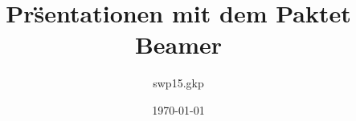 \documentclass{beamer}
\title[SWT-Praktikum]{Pr\"sentationen mit dem Paktet  Beamer}
\author{swp15.gkp}
\date{\today{}}
\begin{document}
\begin{comment}
\section{Allgemeines}
Im Rahmen des SWT-Praktikums wird ein kartenbasiertes Multiplayerspiel entwickelt, das es ermöglicht, ein an das alte Pacman angelehnte Computerspiel auf einem realen Kartenausschnitt zu spielen. Die entstehenden Highscores werden dann zu den jeweiligen Karten gespeichert, um sich mit anderen Spielern messen zu können.


\section{Produktübersicht}
Der Nutzer kann online über die Spiele Website auf das Programm zugreifen.
Der Spieler kann durch Scrollen über die Karte einen Spieleort auswählen. Es sind nur bestimmte Orte als Spielort zugelassen, um eine Vergleichbarkeit zu gewährleisten.
Hat man den Ort ausgewählt, wird das Spielfeld erzeugt und man kann ein neues Spiel beginnen. 
Man kann den Pucman nun mit Hilfe der Pfeiltasten steuern.
Ziel des Spiels ist es den Pucman über die Karte zu steuern und die Kekse, die auf der Karte verteilt liegen, zu fressen. 

An dieser Aufgabe will den Spieler der Geist hindern, der sich auch über das Spielfeld bewegt und Pucman fressen kann. Frisst ein Geist den Spieler, so wird %
die Anzahl seiner Leben wird um eins verringert.
Falls keine Leben mehr übrig sind, wird das Spiel beendet und die erreichte Highscore zusammen mit der Karten URI und dem Namen des Spielers abgespeichert.
Während des Spielens werden die Möglichkeiten zur Veränderung der Kartenansicht deaktiviert. 
Das Spielgeschehen ist durch einen Soundtrack unterlegt, der eine funktionale und inhaltliche Verbindung zwischen Bild und Ton generiert.
Desweiteren werden für das Spiel wichtige Informationen wie aktueller Highscore, die verbleibende Anzahl an Leben und die Möglichkeit, direkt auf die Website des Spiels zugreifen zu können, angezeigt.
\clearpage

\end{comment}
\end{document}
